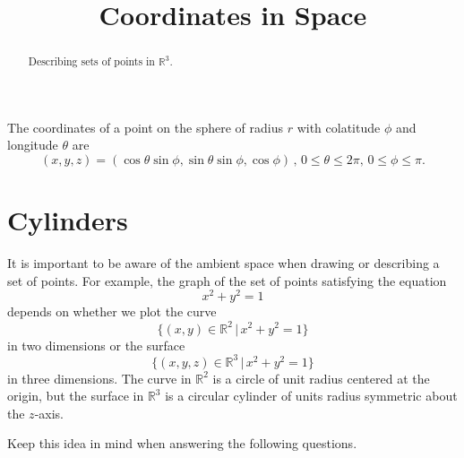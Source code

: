 \documentclass{ximera}
\title{Coordinates in Space}
\begin{document}
\begin{abstract}
Describing sets of points in $\mathbb{R}^3$.
\end{abstract}
\maketitle

 
\begin{onlineOnly}
    \begin{center}
\end{center}
\end{onlineOnly}



The coordinates of a point on the sphere of radius $r$ with colatitude $\phi$ and longitude $\theta$ are
\[
   (x,y,z) = (\cos\theta \sin\phi, \sin\theta \sin \phi, \cos\phi ) \, , \, 0\leq \theta \leq 2\pi, \, 0\leq \phi \leq \pi .
\]
\begin{onlineOnly}
    \begin{center}
\end{center}
\end{onlineOnly}

\section{Cylinders}

It is important to be aware of the ambient space when drawing or describing a set of points. For example, the graph of the set of points satisfying the equation 
\[
    x^2 + y^2 = 1
\]
depends on whether we plot the curve
\[
   \{  (x,y) \in\mathbb{R}^2 \, | \, x^2 + y^2 = 1 \}
\]
in two dimensions or the surface
\[
   \{  (x,y,z) \in\mathbb{R}^3 \, | \, x^2 + y^2 = 1 \}
\]
in three dimensions. The curve in $\mathbb{R}^2$ is a circle of unit radius centered at the origin, but the surface in $\mathbb{R}^3$ is a circular cylinder of units radius symmetric about the $z$-axis.

Keep this idea in mind when answering the following questions.
\end{document}

